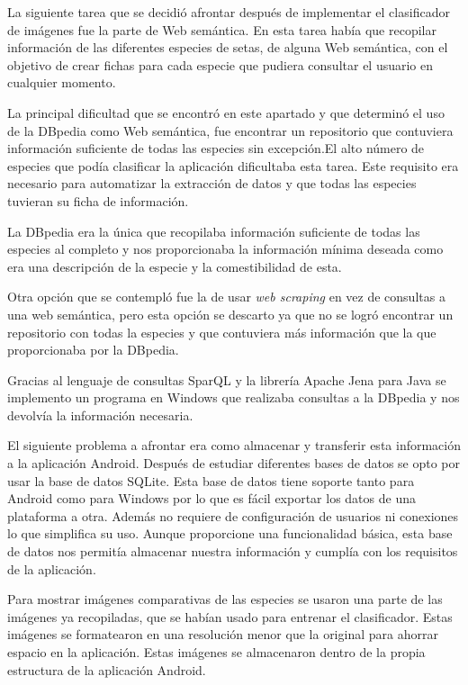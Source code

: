 La siguiente tarea que se decidió afrontar después de implementar el clasificador de imágenes fue la parte de Web semántica. En esta tarea había que recopilar información de las diferentes especies de setas, de alguna Web semántica, con el objetivo de crear fichas para cada especie que pudiera consultar el usuario en cualquier momento.

La principal dificultad que se encontró en este apartado y que determinó el uso de la DBpedia como Web semántica, fue encontrar un repositorio que contuviera información suficiente de todas las especies sin excepción.El alto número de especies que podía clasificar la aplicación dificultaba esta tarea. Este requisito era necesario para automatizar la extracción de datos y que todas las especies tuvieran su ficha de información.

La DBpedia era la única que recopilaba información suficiente de todas las especies al completo y nos proporcionaba la información mínima deseada como era una descripción de la especie y la comestibilidad de esta.

Otra opción que se contempló fue la de usar \textit{web scraping} en vez de consultas a una web semántica, pero esta opción se descarto ya que no se logró encontrar un repositorio con todas la especies y que contuviera más información que la que proporcionaba por la DBpedia.

Gracias al lenguaje de consultas SparQL y la librería Apache Jena para Java se implemento un programa en Windows que realizaba consultas a la DBpedia y nos devolvía la información necesaria.

El siguiente problema a afrontar era como almacenar y transferir esta información a la aplicación Android. Después de estudiar diferentes bases de datos se opto por usar la base de datos SQLite. Esta base de datos tiene soporte tanto para Android como para Windows por lo que es fácil exportar los datos de una plataforma a otra. Además no requiere de configuración de usuarios ni conexiones lo que simplifica su uso. Aunque proporcione una funcionalidad básica, esta base de datos nos permitía almacenar nuestra información y cumplía con los requisitos de la aplicación.

Para mostrar imágenes comparativas de las especies se usaron una parte de las imágenes ya recopiladas, que se habían usado para entrenar el clasificador. Estas imágenes se formatearon en una resolución menor que la original para ahorrar espacio en la aplicación. Estas imágenes se almacenaron dentro de la propia estructura de la aplicación Android.


